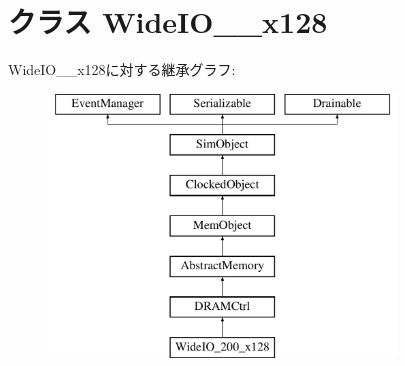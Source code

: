 \hypertarget{classDRAMCtrl_1_1WideIO__200__x128}{
\section{クラス WideIO\_\_\-x128}
\label{classDRAMCtrl_1_1WideIO__200__x128}
}
WideIO\_\_\-x128に対する継承グラフ:\begin{figure}[H]
\begin{center}
\leavevmode
\includegraphics[height=7cm]{classDRAMCtrl_1_1WideIO__200__x128}
\end{center}
\end{figure}
